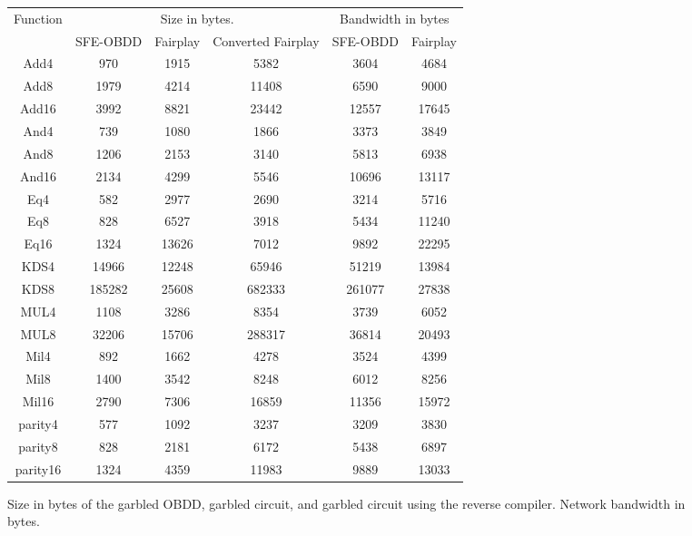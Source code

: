 %
\begin{figure*}


\begin{center}\begin{tabular}{|c||c|c|c||c|c|}
\hline 
Function & \multicolumn{3}{c|}{\sf Size in bytes.} & \multicolumn{2}{c|}{\sf Bandwidth in bytes} \\ 
	&  SFE-OBDD & Fairplay & Converted Fairplay & SFE-OBDD & Fairplay\\ \hline

Add4 & 970 & 1915 & 5382 & 3604 & 4684 \tabularnewline \hline
Add8 & 1979 & 4214 & 11408 & 6590 & 9000 \tabularnewline \hline
Add16 & 3992 & 8821 & 23442 & 12557 & 17645 \tabularnewline \hline
And4 & 739 & 1080 & 1866 & 3373 & 3849 \tabularnewline \hline
And8 & 1206 & 2153 & 3140 & 5813 & 6938 \tabularnewline \hline
And16 & 2134 & 4299 & 5546 & 10696 & 13117 \tabularnewline \hline
Eq4 & 582 & 2977 & 2690 & 3214 & 5716 \tabularnewline \hline
Eq8 & 828 & 6527 & 3918 & 5434 & 11240 \tabularnewline \hline
Eq16 & 1324 & 13626 & 7012 & 9892 & 22295 \tabularnewline \hline
KDS4 & 14966 & 12248 & 65946 & 51219 & 13984 \tabularnewline \hline
KDS8 & 185282 & 25608 & 682333 & 261077 & 27838 \tabularnewline \hline
MUL4 & 1108 & 3286 & 8354 & 3739 & 6052 \tabularnewline \hline
MUL8 & 32206 & 15706 & 288317 & 36814 & 20493 \tabularnewline \hline
Mil4 & 892 & 1662 & 4278 & 3524 & 4399 \tabularnewline \hline
Mil8 & 1400 & 3542 & 8248 & 6012 & 8256 \tabularnewline \hline
Mil16 & 2790 & 7306 & 16859 & 11356 & 15972 \tabularnewline \hline
parity4 & 577 & 1092 & 3237 & 3209 & 3830 \tabularnewline \hline
parity8 & 828 & 2181 & 6172 & 5438 & 6897 \tabularnewline \hline
parity16 & 1324 & 4359 & 11983 & 9889 & 13033 \tabularnewline \hline

\end{tabular}\end{center}

\caption{\label{table:size-bandwidth}Size in bytes of the garbled OBDD, garbled circuit, and garbled circuit using the
reverse compiler. Network bandwidth in  bytes.}

\end{figure*}

